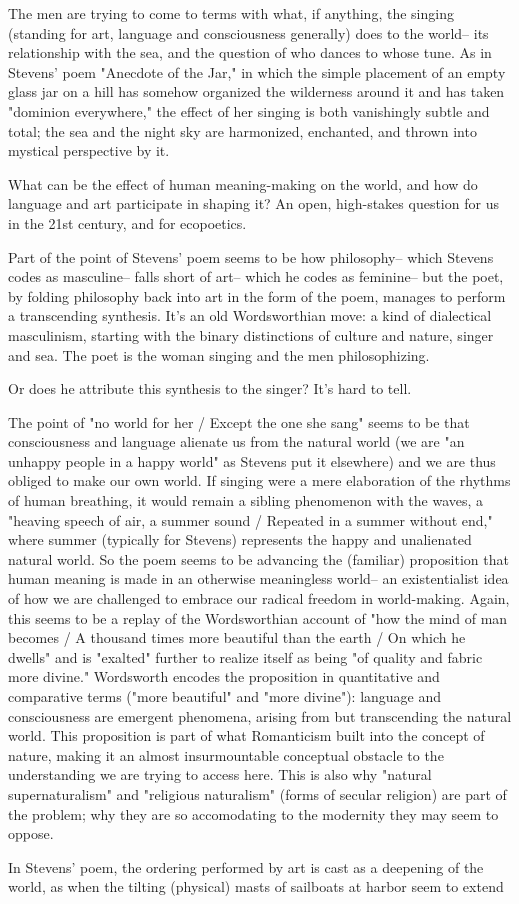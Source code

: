 \documentclass[draft]{article}
\begin{document}
The men are trying to come to terms with what, if anything, the singing (standing for art, language and consciousness generally) does to the world-- its relationship with the sea, and the question of who dances to whose tune. As in Stevens' poem "Anecdote of the Jar," in which the simple placement of an empty glass jar on a hill has somehow organized the wilderness around it and has taken "dominion everywhere," the effect of her singing is both vanishingly subtle and total; the sea and the night sky are harmonized, enchanted, and thrown into mystical perspective by it. \par What can be the effect of human meaning-making on the world, and how do language and art participate in shaping it? An open, high-stakes question for us in the 21st century, and for ecopoetics. \par Part of the point of Stevens' poem seems to be how philosophy-- which Stevens codes as masculine-- falls short of art-- which he codes as feminine-- but the poet, by folding philosophy back into art in the form of the poem, manages to perform a transcending synthesis. It's an old Wordsworthian move: a kind of dialectical masculinism, starting with the binary distinctions of culture and nature, singer and sea. The poet is the woman singing and the men philosophizing. \par Or does he attribute this synthesis to the singer? It's hard to tell. \par The point of "no world for her / Except the one she sang" seems to be that consciousness and language alienate us from the natural world (we are "an unhappy people in a happy world" as Stevens put it elsewhere) and we are thus obliged to make our own world. If singing were a mere elaboration of the rhythms of human breathing, it would remain a sibling phenomenon with the waves, a "heaving speech of air, a summer sound / Repeated in a summer without end," where summer (typically for Stevens) represents the happy and unalienated natural world. So the poem seems to be advancing the (familiar) proposition that human meaning is made in an otherwise meaningless world-- an existentialist idea of how we are challenged to embrace our radical freedom in world-making. Again, this seems to be a replay of the Wordsworthian account of "how the mind of man becomes / A thousand times more beautiful than the earth / On which he dwells" and is "exalted" further to realize itself as being "of quality and fabric more divine." Wordsworth encodes the proposition in quantitative and comparative terms ("more beautiful" and "more divine"): language and consciousness are emergent phenomena, arising from but transcending the natural world. This proposition is part of what Romanticism built into the concept of nature, making it an almost insurmountable conceptual obstacle to the understanding we are trying to access here. This is also why "natural supernaturalism" and "religious naturalism" (forms of secular religion) are part of the problem; why they are so accomodating to the modernity they may seem to oppose. \par In Stevens' poem, the ordering performed by art is cast as a deepening of the world, as when the tilting (physical) masts of sailboats at harbor seem to extend 
\end{document}
